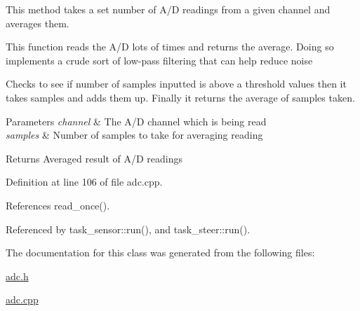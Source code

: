 This method takes a set number of A/\-D readings from a given channel and averages them. 

This function reads the A/\-D lots of times and returns the average. Doing so implements a crude sort of low-\/pass filtering that can help reduce noise

Checks to see if number of samples inputted is above a threshold values then it takes samples and adds them up. Finally it returns the average of samples taken. 
\begin{DoxyParams}{Parameters}
{\em channel} & The A/\-D channel which is being read \\
\hline
{\em samples} & Number of samples to take for averaging reading \\
\hline
\end{DoxyParams}
\begin{DoxyReturn}{Returns}
Averaged result of A/\-D readings 
\end{DoxyReturn}


Definition at line 106 of file adc.\-cpp.



References read\-\_\-once().



Referenced by task\-\_\-sensor\-::run(), and task\-\_\-steer\-::run().



The documentation for this class was generated from the following files\-:\begin{DoxyCompactItemize}
\item 
\hyperlink{adc_8h}{adc.\-h}\item 
\hyperlink{adc_8cpp}{adc.\-cpp}\end{DoxyCompactItemize}
